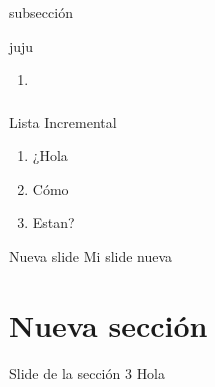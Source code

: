 \begin{frame}{subsección}
\protect\hypertarget{subsecciuxf3n}{}
\begin{block}{juju}
\protect\hypertarget{juju}{}
\begin{enumerate}
\item ~
  \hypertarget{section}{%
  \subsubsection{}\label{section}}
\end{enumerate}
\end{block}
\end{frame}

\begin{frame}{Lista Incremental}
\protect\hypertarget{lista-incremental}{}
\begin{enumerate}[<+->]
\tightlist
\item
  ¿Hola
\item
  Cómo
\item
  Estan?
\end{enumerate}
\end{frame}

\begin{frame}{Nueva slide}
\protect\hypertarget{nueva-slide}{}
Mi slide nueva
\end{frame}

\hypertarget{nueva-secciuxf3n}{%
\section{Nueva sección}\label{nueva-secciuxf3n}}

\begin{frame}{Slide de la sección 3}
\protect\hypertarget{slide-de-la-secciuxf3n-3}{}
Hola
\end{frame}
